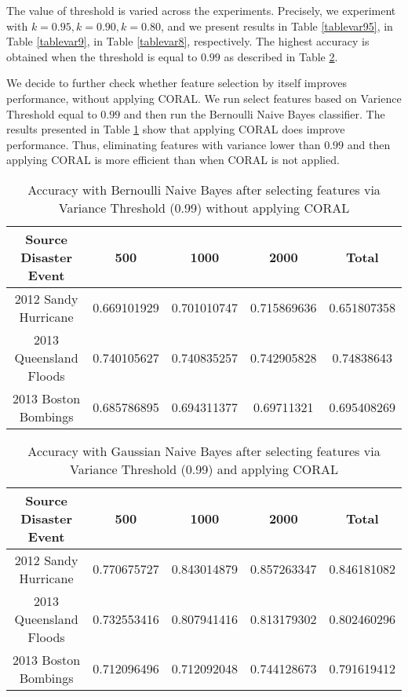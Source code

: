 The value of threshold is varied across the experiments. Precisely, we experiment with $k=0.95, k=0.90, k=0.80$, and we present results in Table \ref{tablevar95}, in Table \ref{tablevar9}, in Table \ref{tablevar8}, respectively. The highest accuracy is obtained when the threshold is equal to $0.99$ as described in Table \ref{tablevar99}. 

We decide to further check whether feature selection by itself improves performance, without applying CORAL. We run select features based on Varience Threshold equal to $0.99$ and then run the Bernoulli Naive Bayes classifier. The results presented in Table \ref{tablevar99nocoral} show that applying CORAL does improve performance. Thus, eliminating features with variance lower than $0.99$ and then applying CORAL is more efficient than when CORAL is not applied. 

\begin{table}[ht]
    \begin{center}
    \caption{Accuracy with Bernoulli Naive Bayes after selecting features via Variance Threshold (0.99) without applying CORAL}
    \begin{tabular}[c]{|c|c|c|c|c|}
        \hline
        Source Disaster Event & 500 & 1000 & 2000 & Total \\
        \hline
        2012 Sandy Hurricane & 0.669101929 & 0.701010747 & 0.715869636 & 0.651807358 \\
        2013 Queensland Floods & 0.740105627 & 0.740835257 & 0.742905828 & 0.74838643 \\
        2013 Boston Bombings & 0.685786895 & 0.694311377 & 0.69711321 & 0.695408269 \\
        \hline
    \end{tabular}
    \label{tablevar99nocoral}
   \end{center}
\end{table}


\begin{table}[ht]
    \begin{center}
    \caption{Accuracy with Gaussian Naive Bayes after selecting features via Variance Threshold (0.99) and applying CORAL}
    \begin{tabular}[c]{|c|c|c|c|c|}
        \hline
        Source Disaster Event & 500 & 1000 & 2000 & Total \\
        \hline
        2012 Sandy Hurricane & 0.770675727 & 0.843014879 & 0.857263347 & 0.846181082 \\
        2013 Queensland Floods & 0.732553416 & 0.807941416 & 0.813179302 & 0.802460296 \\
        2013 Boston Bombings & 0.712096496 & 0.712092048 & 0.744128673 & 0.791619412 \\
        \hline
    \end{tabular}
    \label{tablevar99}
   \end{center}
\end{table}




